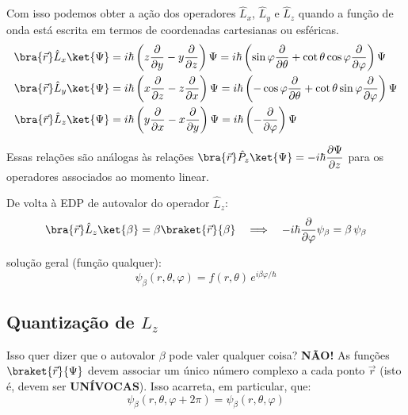 Com isso podemos obter a ação dos operadores $\hat{L}_x$, $\hat{L}_y$ e $\hat{L}_z$ quando a função de onda está escrita em termos de coordenadas cartesianas ou esféricas.
\begin{align}
    \bra{\vec{r}}\hat{L}_x\ket{\Psi} &= i\hbar\left( z\frac{\partial}{\partial y} - y\frac{\partial}{\partial z} \right)\Psi
    = i\hbar\left( \sin\varphi \frac{\partial}{\partial \theta} + \cot\theta\cos\varphi\frac{\partial}{\partial \varphi} \right)\Psi \label{eq:aula19_Lx_esferica} \\
    \bra{\vec{r}}\hat{L}_y\ket{\Psi} &= i\hbar\left( x\frac{\partial}{\partial z} - z\frac{\partial}{\partial x} \right)\Psi
    = i\hbar\left( -\cos\varphi \frac{\partial}{\partial \theta} + \cot\theta\sin\varphi\frac{\partial}{\partial \varphi} \right)\Psi \label{eq:aula19_Ly_esferica} \\
    \bra{\vec{r}}\hat{L}_z\ket{\Psi} &= i\hbar\left( y\frac{\partial}{\partial x} - x\frac{\partial}{\partial y} \right)\Psi
    = i\hbar\left( -\frac{\partial}{\partial \varphi} \right)\Psi \label{eq:aula19_Lz_esferica}
\end{align}

Essas relações são análogas às relações $\bra{\vec{r}}\hat{P}_z\ket{\Psi} = -i\hbar \dfrac{\partial \Psi}{\partial z}$ para os operadores associados ao momento linear.

De volta à EDP de autovalor do operador $\hat{L}_z$:
\begin{equation}
    \bra{\vec{r}}\hat{L}_z\ket{\beta} = \beta\braket{\vec{r}}{\beta}
    \quad \Longrightarrow \quad
    -i\hbar \frac{\partial}{\partial \varphi}\psi_\beta = \beta \, \psi_\beta
\label{eq:aula19_Lz_autovalor_EDP}
\end{equation}

solução geral (função qualquer):
\begin{equation}
    \psi_\beta(r,\theta,\varphi) = f(r,\theta) \, e^{i\beta\varphi/\hbar}
\label{eq:aula19_Lz_solucao_geral}
\end{equation}

\subsection*{Quantização de $L_z$}

Isso quer dizer que o autovalor $\beta$ pode valer qualquer coisa? \textbf{NÃO!} As funções $\braket{\vec{r}}{\Psi}$ devem associar um único número complexo a cada ponto $\vec{r}$ (isto é, devem ser \textbf{UNÍVOCAS}). Isso acarreta, em particular, que:
\begin{equation}
    \psi_\beta(r,\theta,\varphi+2\pi) = \psi_\beta(r,\theta,\varphi)
\label{eq:aula19_univocidade}
\end{equation}

